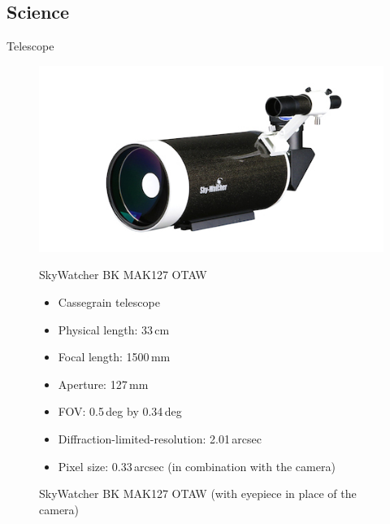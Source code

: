 \documentclass[11pt, aspectratio=169]{beamer}
\begin{document}
\subsection{Science}
\begin{frame}[t]{Telescope}
\begin{figure}[!htb]
    \centering
    \begin{minipage}{.5\textwidth}
        \centering
        \includegraphics[width=\linewidth]{figures/images/SkyWatcher_BKMAK127OTAW.jpg}
        \caption*{SkyWatcher BK MAK127 OTAW (with eyepiece in place of the camera)}
    \end{minipage}%
    \begin{minipage}{0.5\textwidth}
    SkyWatcher BK MAK127 OTAW
    \begin{itemize}%
        \item Cassegrain telescope 
        \item Physical length: 33\,cm
        \item Focal length: 1500\,mm 
        \item Aperture: 127\,mm
        \item FOV: 0.5\,deg by 0.34\,deg 
        \item Diffraction-limited-resolution: 2.01\,arcsec
        \item Pixel size: 0.33\,arcsec (in \newline combination with the camera)
    \end{itemize}
    \end{minipage}
\end{figure}
\end{frame}
\end{document}
